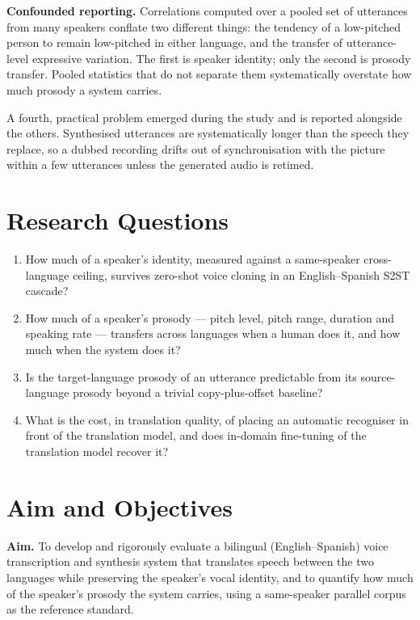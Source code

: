 \textbf{Confounded reporting.} Correlations computed over a pooled set of utterances from many
speakers conflate two different things: the tendency of a low-pitched person to remain low-pitched
in either language, and the transfer of utterance-level expressive variation. The first is speaker
identity; only the second is prosody transfer. Pooled statistics that do not separate them
systematically overstate how much prosody a system carries.

A fourth, practical problem emerged during the study and is reported alongside the others.
Synthesised utterances are systematically longer than the speech they replace, so a dubbed
recording drifts out of synchronisation with the picture within a few utterances unless the
generated audio is retimed.

\section{Research Questions}
\label{sec:questions}

\begin{enumerate}[label=RQ\arabic*., leftmargin=3.2em]
  \item How much of a speaker's identity, measured against a same-speaker cross-language ceiling,
        survives zero-shot voice cloning in an English--Spanish S2ST cascade?
  \item How much of a speaker's prosody --- pitch level, pitch range, duration and speaking rate
        --- transfers across languages when a human does it, and how much when the system does it?
  \item Is the target-language prosody of an utterance predictable from its source-language
        prosody beyond a trivial copy-plus-offset baseline?
  \item What is the cost, in translation quality, of placing an automatic recogniser in front of
        the translation model, and does in-domain fine-tuning of the translation model recover it?
\end{enumerate}

\section{Aim and Objectives}
\label{sec:objectives}

\textbf{Aim.} To develop and rigorously evaluate a bilingual (English--Spanish) voice transcription
and synthesis system that translates speech between the two languages while preserving the
speaker's vocal identity, and to quantify how much of the speaker's prosody the system carries,
using a same-speaker parallel corpus as the reference standard.

